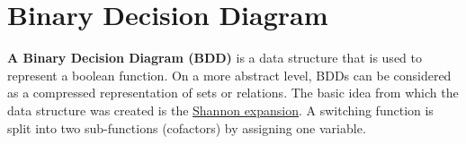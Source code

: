 \documentclass[12pt]{book}
\begin{document}
\section{Binary Decision Diagram}
\label{sec:Binary Decision Diagram}

\begin{defi}\label{def:bdd} 
      \textbf{A Binary Decision Diagram (BDD)} is a data structure that is used to represent a boolean function. 
      On a more abstract level, BDDs can be considered as a compressed representation of sets or relations. 
      The basic idea from which the data structure was created is the \href{https://en.wikipedia.org/wiki/Boole%27s_expansion_theorem}{Shannon expansion}. 
	  A switching function is split into two sub-functions (cofactors) by assigning one variable. 
\end{defi} 
\end{document}
